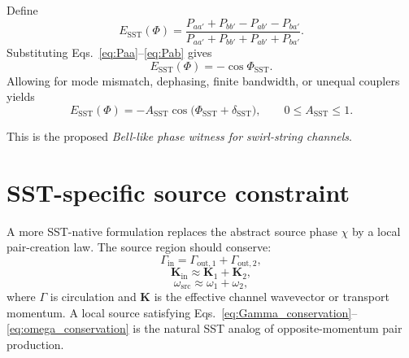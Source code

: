 \documentclass[11pt]{article}
\begin{document}
            Define
            \begin{equation}
                E_{\mathrm{SST}}(\Phi)=
                \frac{
                    P_{aa'}+P_{bb'}-P_{ab'}-P_{ba'}
                }{
                    P_{aa'}+P_{bb'}+P_{ab'}+P_{ba'}
                }.
                \label{eq:EdefSST}
            \end{equation}
            Substituting Eqs.~\eqref{eq:Paa}--\eqref{eq:Pab} gives
            \begin{equation}
                E_{\mathrm{SST}}(\Phi)
                =
                -\cos \Phi_{\mathrm{SST}}.
                \label{eq:EidealSST}
            \end{equation}
            Allowing for mode mismatch, dephasing, finite bandwidth, or unequal couplers yields
            \begin{equation}
                E_{\mathrm{SST}}(\Phi)
                =
                -A_{\mathrm{SST}}\cos\!\bigl(\Phi_{\mathrm{SST}}+\delta_{\mathrm{SST}}\bigr),
                \qquad
                0\le A_{\mathrm{SST}}\le 1.
                \label{eq:ESSTreal}
            \end{equation}
            
            This is the proposed \emph{Bell-like phase witness for swirl-string channels}.
    
    \section{SST-specific source constraint}
        
        A more SST-native formulation replaces the abstract source phase \(\chi\) by a local pair-creation law. The source region should conserve:
        \begin{equation}
            \Gamma_{\mathrm{in}} = \Gamma_{\mathrm{out},1}+\Gamma_{\mathrm{out},2},
            \label{eq:Gamma_conservation}
        \end{equation}
        \begin{equation}
            \mathbf{K}_{\mathrm{in}} \approx \mathbf{K}_{1}+\mathbf{K}_{2},
            \label{eq:K_conservation}
        \end{equation}
        \begin{equation}
            \omega_{\mathrm{src}} \approx \omega_1+\omega_2,
            \label{eq:omega_conservation}
        \end{equation}
        where \(\Gamma\) is circulation and \(\mathbf{K}\) is the effective channel wavevector or transport momentum. A local source satisfying Eqs.~\eqref{eq:Gamma_conservation}--\eqref{eq:omega_conservation} is the natural SST analog of opposite-momentum pair production.
    
\end{document}
